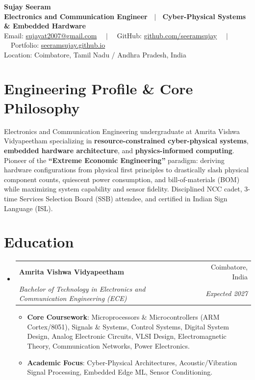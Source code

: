 \documentclass[letterpaper,10pt]{article}
\makeatletter
\newcommand{\resumeSubheading}[4]{
  \vspace{-2pt}\item
    \begin{tabular*}{\linewidth}[t]{l@{\extracolsep{\fill}}r}
      \textbf{#1} & #2 \\
      \textit{\small#3} & \textit{\small #4} \\
    \end{tabular*}\vspace{-3pt}
}
\newcommand{\resumeSubHeadingListStart}{\begin{itemize}[leftmargin=*]}
\newcommand{\resumeSubHeadingListEnd}{\end{itemize}}
\newcommand{\resumeItemListStart}{\begin{itemize}[leftmargin=14pt, labelsep=4pt, itemsep=0.5pt, parsep=0pt]}
\newcommand{\resumeItemListEnd}{\end{itemize}\vspace{-3pt}}
\makeatother
\begin{document}
\begin{center}
  {\Huge \textbf{Sujay Seeram}} \\ \vspace{3pt}
  \textbf{Electronics and Communication Engineer \ $|$ \ Cyber-Physical Systems \& Embedded Hardware} \\ \vspace{3pt}
  \small Email: \href{mailto:sujayat2007@gmail.com}{sujayat2007@gmail.com} \ \ $|$ \ \ 
  GitHub: \href{https://github.com/seeramsujay}{github.com/seeramsujay} \ \ $|$ \ \ 
  Portfolio: \href{https://seeramsujay.github.io}{seeramsujay.github.io} \\ \vspace{1pt}
  \footnotesize Location: Coimbatore, Tamil Nadu / Andhra Pradesh, India
\end{center}

\vspace{-4pt}
\section{Engineering Profile \& Core Philosophy}
\vspace{1pt}
\small{
Electronics and Communication Engineering undergraduate at Amrita Vishwa Vidyapeetham specializing in \textbf{resource-constrained cyber-physical systems}, \textbf{embedded hardware architecture}, and \textbf{physics-informed computing}. Pioneer of the \textbf{``Extreme Economic Engineering''} paradigm: deriving hardware configurations from physical first principles to drastically slash physical component counts, quiescent power consumption, and bill-of-materials (BOM) while maximizing system capability and sensor fidelity. Disciplined NCC cadet, 3-time Services Selection Board (SSB) attendee, and certified in Indian Sign Language (ISL).
}

\section{Education}
  \resumeSubHeadingListStart
    \resumeSubheading
      {Amrita Vishwa Vidyapeetham}{Coimbatore, India}
      {Bachelor of Technology in Electronics and Communication Engineering (ECE)}{Expected 2027}
      \resumeItemListStart
        \item{\textbf{Core Coursework}: Microprocessors \& Microcontrollers (ARM Cortex/8051), Signals \& Systems, Control Systems, Digital System Design, Analog Electronic Circuits, VLSI Design, Electromagnetic Theory, Communication Networks, Power Electronics.}
        \item{\textbf{Academic Focus}: Cyber-Physical Architectures, Acoustic/Vibration Signal Processing, Embedded Edge ML, Sensor Conditioning.}
      \resumeItemListEnd
  \resumeSubHeadingListEnd
\end{document}
